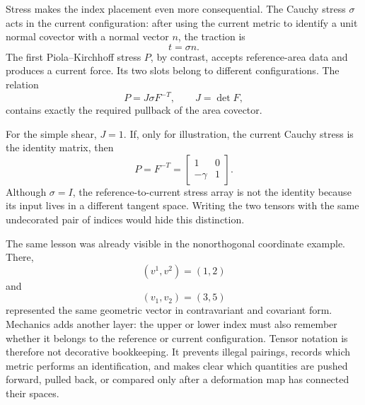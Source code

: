 Stress makes the index placement even more consequential.  The Cauchy stress \(\sigma\) acts in the current configuration: after using the current metric to identify a unit normal covector with a normal vector \(n\), the traction is
\[
  t=\sigma n.
\]
The first Piola--Kirchhoff stress \(P\), by contrast, accepts reference-area data and produces a current force.  Its two slots belong to different configurations.  The relation
\[
  P=J\sigma F^{-T},
  \qquad
  J=\det F,
\]
contains exactly the required pullback of the area covector.

For the simple shear, \(J=1\).  If, only for illustration, the current Cauchy stress is the identity matrix, then
\[
  P=F^{-T}
  =
  \begin{bmatrix}
    1&0\\
    -\gamma&1
  \end{bmatrix}.
\]
Although \(\sigma=I\), the reference-to-current stress array is not the identity because its input lives in a different tangent space.  Writing the two tensors with the same undecorated pair of indices would hide this distinction.

The same lesson was already visible in the nonorthogonal coordinate example.  There,
\[
  (v^1,v^2)=(1,2)
\]
and
\[
  (v_1,v_2)=(3,5)
\]
represented the same geometric vector in contravariant and covariant form.  Mechanics adds another layer: the upper or lower index must also remember whether it belongs to the reference or current configuration.  Tensor notation is therefore not decorative bookkeeping.  It prevents illegal pairings, records which metric performs an identification, and makes clear which quantities are pushed forward, pulled back, or compared only after a deformation map has connected their spaces.

